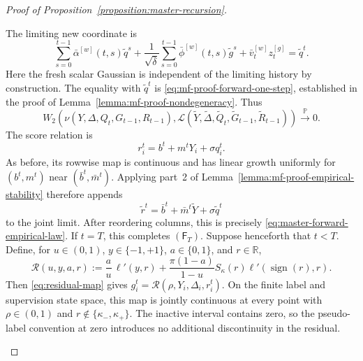 \begin{proof}[Proof of Proposition~\ref{proposition:master-recursion}]
\begin{enumerate}[wide]
\begin{enumerate}[label=(\alph*),wide]
        The limiting new coordinate is
        \[
            \sum_{s=0}^{t-1}
                \bar\alpha^{[w]}(t,s)\tilde q^s
            +
            \frac1{\sqrt{\bar\delta}}
            \sum_{s=0}^{t-1}
                \bar\phi^{[w]}(t,s)\tilde g^s
            +
            \bar v_t^{[w]}z_t^{[g]}
            =
            \tilde q^t.
        \]
        Here the fresh scalar Gaussian is independent of
        the limiting history by construction.
        The equality with $\tilde q^t$ is
        \eqref{eq:mf-proof-forward-one-step}, established in the
        proof of Lemma~\ref{lemma:mf-proof-nondegeneracy}.
        Thus
        \begin{equation}
            W_2\left(
                \nu(Y,\Delta,Q_t,G_{t-1},R_{t-1}),
                \mathscr L(
                    \tilde Y,\tilde\Delta,
                    \tilde Q_t,\tilde G_{t-1},\tilde R_{t-1}
                )
            \right)
            \xrightarrow{\mathbb P}0.
            \label{eq:master-proof-forward-q-limit}
        \end{equation}
        The score relation is
        \[
            r_i^t=b^t+m^tY_i+\sigma q_i^t.
        \]
        As before, its rowwise map is continuous and has linear
        growth uniformly for $(b^t,m^t)$ near
        $(\bar b^t,\bar m^t)$.
        Applying part~2 of
        Lemma~\ref{lemma:mf-proof-empirical-stability}
        therefore appends
        \[
            \tilde r^t
            =
            \bar b^t+\bar m^t\tilde Y+\sigma\tilde q^t
        \]
        to the joint limit.
        After reordering columns, this is precisely
        \eqref{eq:master-forward-empirical-law}.
        If $t=T$, this completes $(\mathsf F_T)$.
        Suppose henceforth that $t<T$.
        Define, for $u\in(0,1)$, $y\in\{-1,+1\}$,
        $a\in\{0,1\}$, and $r\in\mathbb R$,
        \[
            \mathcal R(u,y,a,r)
            :=\frac a u\,\ell'(y,r)
            +\frac{\pi(1-a)}{1-u}
                S_\kappa(r)\ell'(\operatorname{sign}(r),r).
        \]
        Then \eqref{eq:residual-map} gives
        $g_i^t=\mathcal R(\rho,Y_i,\Delta_i,r_i^t)$.
        On the finite label and supervision state space,
        this map is jointly continuous at every point
        with $\rho\in(0,1)$ and
        $r\notin\{\kappa_-,\kappa_+\}$.
        The inactive interval contains zero, so the
        pseudo-label convention at zero introduces no
        additional discontinuity in the residual.


\end{enumerate}
\end{enumerate}
\end{proof}
